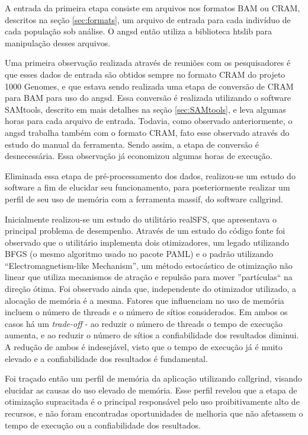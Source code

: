 \documentclass[cic,tc]{iiufrgs}
\begin{document}
A entrada da primeira etapa consiste em arquivos nos formatos BAM ou CRAM,
descritos na seção \ref{sec:formats}, um arquivo de entrada para cada indivíduo
de cada população sob análise. O angsd então utiliza a biblioteca
htslib\cite{bonfield2021htslib} para manipulação desses arquivos.

Uma primeira observação realizada através de reuniões com os pesquisadores é
que esses dados de entrada são obtidos sempre no formato CRAM do projeto 1000
Genomes, e que estava sendo realizada uma etapa de conversão de CRAM para BAM
para uso do angsd. Essa conversão é realizada utilizando o software SAMtools,
descrito em mais detalhes na seção \ref{sec:SAMtools}, e leva algumas horas
para cada arquivo de entrada. Todavia, como observado anteriormente, o angsd
trabalha também com o formato CRAM, fato esse observado através do estudo do
manual da ferramenta. Sendo assim, a etapa de conversão é desnecessária. Essa
observação já economizou algumas horas de execução.

Eliminada essa etapa de pré-processamento dos dados, realizou-se um estudo do
software a fim de elucidar seu funcionamento, para posteriormente realizar um
perfil de seu uso de memória com a ferramenta massif, do software
callgrind.\cite{weidendorfer2008sequential}

Inicialmente realizou-se um estudo do utilitário realSFS, que apresentava o
principal problema de desempenho. Através de um estudo do código fonte foi
observado que o utilitário implementa dois otimizadores, um legado utilizando
BFGS (o mesmo algoritmo usado no pacote PAML) e o padrão utilizando
``Electromagnetism-like Mechanism'', um método estocástico de otimização
não linear que utiliza mecanismos de atração e repulsão para mover
''partículas`` na direção ótima.\cite{5636954} Foi observado ainda que,
independente do otimizador utilizado, a alocação de memória é a mesma. Fatores
que influenciam no uso de memória incluem o número de threads e o número de
sítios considerados. Em ambos os casos há um \textit{trade-off} - ao reduzir o
número de threads o tempo de execução aumenta, e ao reduzir o número de sítios
a confiabilidade dos resultados diminui.\cite{popgen2016angsd} A redução de
ambos é indesejável, visto que o tempo de execução já é muito elevado e a
confiabilidade dos resultados é fundamental.

Foi traçado então um perfil de memória da aplicação utilizando callgrind,
visando elucidar as causas do uso elevado de memória. Esse perfil revelou que a
etapa de otimização supracitada é o principal responsável pelo uso
proibitivamente alto de recursos, e não foram encontradas oportunidades de
melhoria que não afetassem o tempo de execução ou a confiabilidade dos
resultados.
\end{document}
